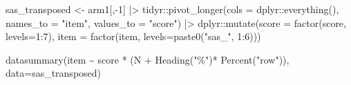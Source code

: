 \documentclass[
  letterpaper,
  DIV=11,
  numbers=noendperiod]{scrreprt}
\newenvironment{Shaded}{\begin{snugshade}}{\end{snugshade}}
\newcommand{\AttributeTok}[1]{\textcolor[rgb]{0.40,0.45,0.13}{#1}}
\newcommand{\DecValTok}[1]{\textcolor[rgb]{0.68,0.00,0.00}{#1}}
\newcommand{\FunctionTok}[1]{\textcolor[rgb]{0.28,0.35,0.67}{#1}}
\newcommand{\NormalTok}[1]{\textcolor[rgb]{0.00,0.23,0.31}{#1}}
\newcommand{\OtherTok}[1]{\textcolor[rgb]{0.00,0.23,0.31}{#1}}
\newcommand{\SpecialCharTok}[1]{\textcolor[rgb]{0.37,0.37,0.37}{#1}}
\newcommand{\StringTok}[1]{\textcolor[rgb]{0.13,0.47,0.30}{#1}}
\begin{document}
\begin{Shaded}
\begin{Highlighting}[]
\NormalTok{sas\_transposed }\OtherTok{\textless{}{-}}\NormalTok{ arm1[,}\SpecialCharTok{{-}}\DecValTok{1}\NormalTok{] }\SpecialCharTok{|\textgreater{}} 
\NormalTok{  tidyr}\SpecialCharTok{::}\FunctionTok{pivot\_longer}\NormalTok{(}\AttributeTok{cols =}\NormalTok{ dplyr}\SpecialCharTok{::}\FunctionTok{everything}\NormalTok{(), }\AttributeTok{names\_to =} \StringTok{"item"}\NormalTok{, }\AttributeTok{values\_to =} \StringTok{"score"}\NormalTok{) }\SpecialCharTok{|\textgreater{}} 
\NormalTok{  dplyr}\SpecialCharTok{::}\FunctionTok{mutate}\NormalTok{(}\AttributeTok{score =} \FunctionTok{factor}\NormalTok{(score, }\AttributeTok{levels=}\DecValTok{1}\SpecialCharTok{:}\DecValTok{7}\NormalTok{),}
                \AttributeTok{item =} \FunctionTok{factor}\NormalTok{(item, }\AttributeTok{levels=}\FunctionTok{paste0}\NormalTok{(}\StringTok{"sas\_"}\NormalTok{, }\DecValTok{1}\SpecialCharTok{:}\DecValTok{6}\NormalTok{)))}

\FunctionTok{datasummary}\NormalTok{(item }\SpecialCharTok{\textasciitilde{}}\NormalTok{ score }\SpecialCharTok{*}\NormalTok{ (N }\SpecialCharTok{+} \FunctionTok{Heading}\NormalTok{(}\StringTok{"\%"}\NormalTok{)}\SpecialCharTok{*} \FunctionTok{Percent}\NormalTok{(}\StringTok{"row"}\NormalTok{)), }\AttributeTok{data=}\NormalTok{sas\_transposed)}
\end{Highlighting}
\end{Shaded}
\end{document}
